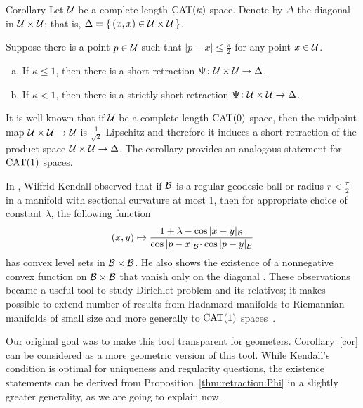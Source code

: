 \documentclass[oneside,a4paper, 12pt]{article}
\begin{document}
\begin{thm}{Corollary}\label{cor}
Let $\mathcal{U}$ be a complete length $\mathrm{CAT}(\kappa)$ space.
Denote by $\Delta$ the diagonal in $\mathcal{U}\times \mathcal{U}$;
that is, $\Delta=\{\,(x,x)\in \mathcal{U}\times \mathcal{U}\,\}$.

Suppose there is a point $p\in \mathcal{U}$ such that $|p-x|\le \tfrac\pi2$ for any point $x\in \mathcal{U}$.
\begin{enumerate}[(a)]
\item
If $\kappa\le 1$, then there is a short retraction $\Psi\colon\mathcal{U}\times \mathcal{U}\to \Delta$.
\item If $\kappa<1$, then there is a strictly short retraction $\Psi\colon\mathcal{U}\times \mathcal{U}\to \Delta$.
\end{enumerate}

\end{thm}

It is well known that if $\mathcal{U}$ be a complete length $\mathrm{CAT}(0)$ space, then the midpoint map $\mathcal{U}\times \mathcal{U}\to \mathcal{U}$ is $\tfrac1{\sqrt{2}}$-Lipschitz and therefore it induces a short retraction of the product space $\mathcal{U}\times \mathcal{U}\to\Delta$. 
The corollary provides an analogous statement for $\mathrm{CAT}(1)$ spaces.


In \cite[(4.1)]{kendall}, Wilfrid Kendall observed that if $\mathcal{B}$ is a regular geodesic ball or radius $r<\tfrac\pi2$ in a manifold with sectional curvature at most 1, then for appropriate choice of constant $\lambda$, the following function
\[(x,y)\mapsto 
\frac{1+\lambda-\cos|x-y|_{\spc{B}}}{\cos|p-x|_{\spc{B}}\cdot \cos|p-y|_{\spc{B}}}
\]
has convex level sets in ${\mathcal{B}}\times {\mathcal{B}}$.
He also shows the existence of a nonnegative convex function on ${\mathcal{B}}\times {\mathcal{B}}$ that vanish only on the diagonal \cite[(4.2)]{kendall}.
These observations became a useful tool to study Dirichlet problem and its relatives;
it makes possible to extend number of results from Hadamard manifolds to Riemannian manifolds of small size
and more generally to $\mathrm{CAT}(1)$ spaces~\cite{yokota,BFHMSZ,fuglede,serbinowski}. 

Our original goal was to make this tool transparent for geometers.
Corollary~\ref{cor} can be considered as a more geometric version of this tool.
While Kendall's condition is optimal for uniqueness and regularity questions, the existence statements can be derived from  Proposition~\ref{thm:retraction:Phi} in a
slightly greater generality, as  we are going to explain now.
\end{document}
